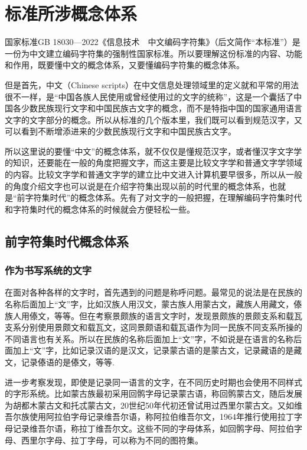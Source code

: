 \documentclass{brochure}
\begin{document}
\chapter{标准所涉概念体系}

国家标准GB 18030—2022《信息技术　中文编码字符集》（后文简作“本标准”）是一份为中文建立编码字符集的强制性国家标准。所以要理解这份标准的内容、功能和作用，既要懂中文的概念体系，又要懂编码字符集的概念体系。

但是首先，中文（Chinese scripts）在中文信息处理领域里的定义就和平常的用法很不一样，是“中国各族人民使用或曾经使用过的文字的统称”，这是一个囊括了中国各少数民族现行文字和中国民族古文字的概念，而不是特指中国的国家通用语言文字的文字部分的概念。所以从标准的几个版本里，我们既可以看到规范汉字，又可以看到不断增添进来的少数民族现行文字和中国民族古文字。

所以这里说的要懂“中文”的概念体系，就不仅仅是懂规范汉字，或者懂汉字文字学的知识，还要能在一般的角度把握文字，而这主要是比较文字学和普通文字学领域的内容。比较文字学和普通文字学的建立比中文进入计算机要早很多，所以从一般的角度介绍文字也可以说是在介绍字符集出现以前的时代里的概念体系，也就是“前字符集时代”的概念体系。先有了对文字的一般把握，在理解编码字符集时代和字符集时代的概念体系的时候就会方便轻松一些。

\section{前字符集时代概念体系}

\subsection{作为书写系统的文字}

在面对各种各样的文字时，首先遇到的问题是称呼问题。最常见的说法是在民族的名称后面加上“文”字，比如汉族人用汉文，蒙古族人用蒙古文，藏族人用藏文，傣族人用傣文，等等。但在考察景颇族的语言文字时，发现景颇族的景颇支系和载瓦支系分别使用景颇文和载瓦文，这同景颇语和载瓦语作为同一民族不同支系所操的不同语言也有关系。所以在民族的名称后面加上“文”字，不如说是在语言的名称后面加上“文”字，比如记录汉语的是汉文，记录蒙古语的是蒙古文，记录藏语的是藏文，记录傣语的是傣文，等等.

进一步考察发现，即使是记录同一语言的文字，在不同历史时期也会使用不同样式的字形系统。比如蒙古族最初采用回鹘字母记录蒙古语，称回鹘蒙古文，随后发展为胡都木蒙古文和托忒蒙古文，20世纪50年代初还曾试用过西里尔蒙古文。又如维吾尔族使用阿拉伯字母记录维吾尔语，称阿拉伯维吾尔文，1964年推行使用拉丁字母记录维吾尔语，称拉丁维吾尔文。这些不同的字母体系，如回鹘字母、阿拉伯字母、西里尔字母、拉丁字母，可以称为不同的图符集。
\end{document}
